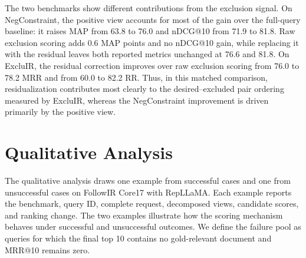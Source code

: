 \documentclass[letterpaper]{article}
\begin{document}
The two benchmarks show different contributions from the exclusion signal.
On NegConstraint, the positive view accounts for most of the gain over the
full-query baseline: it raises MAP from 63.8 to 76.0 and nDCG@10 from 71.9 to
81.8.  Raw exclusion scoring adds 0.6 MAP points and no nDCG@10 gain, while
replacing it with the residual leaves both reported metrics unchanged at 76.6
and 81.8.  On ExcluIR, the residual correction improves over raw exclusion
scoring from 76.0 to 78.2 MRR and from 60.0 to 82.2 RR.  Thus, in this matched
comparison, residualization contributes most clearly to the desired--excluded
pair ordering measured by ExcluIR, whereas the NegConstraint improvement is
driven primarily by the positive view.

\section{Qualitative Analysis}
\label{app:qualitative}

The qualitative analysis draws one example from successful cases and one from
unsuccessful cases on FollowIR Core17 with RepLLaMA.  Each example reports the
benchmark, query ID, complete request, decomposed views, candidate scores, and
ranking change.  The two examples illustrate how the scoring mechanism behaves
under successful and unsuccessful outcomes.  We define the failure pool as
queries for which the final top 10 contains no gold-relevant document and
MRR@10 remains zero.
\end{document}
